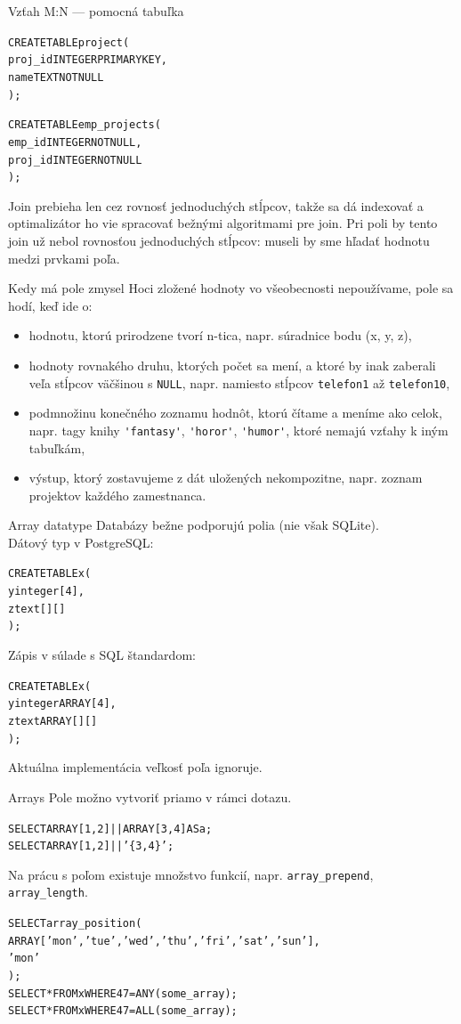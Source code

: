 \documentclass[12pt]{beamer}
\begin{document}
\begin{frame}[fragile]{Vzťah M:N --- pomocná tabuľka}
\begin{alltt}
CREATE TABLE project (
   proj_id INTEGER PRIMARY KEY,
   name TEXT NOT NULL
);

CREATE TABLE emp_projects (
   emp_id INTEGER NOT NULL,
   proj_id INTEGER NOT NULL
);
\end{alltt}
Join prebieha len cez rovnosť jednoduchých stĺpcov, takže sa dá indexovať a optimalizátor ho vie spracovať bežnými algoritmami pre join.
Pri poli by tento join už nebol rovnosťou jednoduchých stĺpcov:
museli by sme hľadať hodnotu medzi prvkami poľa.
\end{frame}

\begin{frame}[fragile]{Kedy má pole zmysel}
Hoci zložené hodnoty vo všeobecnosti nepoužívame, pole sa hodí, keď ide o:
\begin{itemize}
\item hodnotu, ktorú prirodzene tvorí n-tica, napr. súradnice bodu (x, y, z),
\item hodnoty rovnakého druhu, ktorých počet sa mení, a ktoré by inak zaberali veľa stĺpcov väčšinou s \texttt{NULL}, napr. namiesto stĺpcov \verb|telefon1| až \verb|telefon10|,
\item podmnožinu konečného zoznamu hodnôt, ktorú čítame a meníme ako celok, napr. tagy knihy \verb|'fantasy'|, \verb|'horor'|, \verb|'humor'|, ktoré nemajú vzťahy k iným tabuľkám,
\item výstup, ktorý zostavujeme z dát uložených nekompozitne, napr. zoznam projektov každého zamestnanca.
\end{itemize}
\end{frame}

\begin{frame}[fragile]{Array datatype}
Databázy bežne podporujú polia (nie však SQLite).\\
Dátový typ v PostgreSQL:
\begin{alltt}
  CREATE TABLE x (
      y  integer[4],
      z  text[][]
  );
\end{alltt}
Zápis v súlade s SQL štandardom:
\begin{alltt}
  CREATE TABLE x (
      y  integer ARRAY[4],
      z  text ARRAY[][]
  );
\end{alltt}
Aktuálna implementácia veľkosť poľa ignoruje.
\end{frame}

\begin{frame}[fragile]{Arrays}
\small
Pole možno vytvoriť priamo v rámci dotazu.
\begin{alltt}
SELECT ARRAY[1,2] || ARRAY[3,4] AS a;
SELECT ARRAY[1, 2] || '\{3, 4\}';
\end{alltt}
Na prácu s poľom existuje množstvo funkcií, napr. \verb|array_prepend|, \verb|array_length|.
\begin{alltt}
SELECT array_position(
    ARRAY['mon','tue','wed','thu','fri','sat','sun'],
    'mon'
  );
SELECT * FROM x WHERE 47 = ANY (some_array);
SELECT * FROM x WHERE 47 = ALL (some_array);
\end{alltt}
\end{frame}
\end{document}
